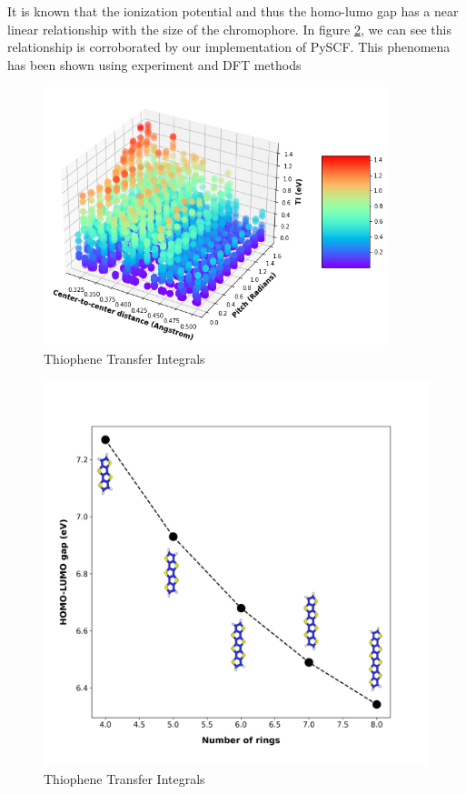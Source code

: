 It is known that the ionization potential and thus the homo-lumo gap has a near linear relationship with the
size of the chromophore. In figure \ref{fig:fused}, we can see this relationship is corroborated by our
implementation of PySCF. This phenomena has been shown using experiment and DFT methods  \cite{Arago2010}


\begin{figure}
  \center
  \includegraphics[width=10cm]{figures/transfer_integral_plot.png}
  \caption{Thiophene Transfer Integrals}
  \label{fig:TI}
\end{figure}
\begin{figure}
  \center
  \includegraphics[width=15cm]{figures/fused-ring-figure.png}
  \caption{Thiophene Transfer Integrals}
  \label{fig:fused}
\end{figure}


